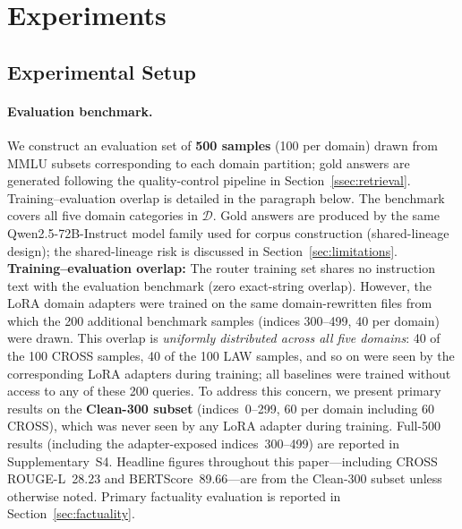 \documentclass[a4paper,fleql,doubleblind]{cas-sc}
\begin{document}
\section{Experiments}
\label{sec:experiments}

\subsection{Experimental Setup}
\label{ssec:setup}
\paragraph{Evaluation benchmark.}
We construct an evaluation set of \textbf{500 samples} (100 per domain) drawn
from MMLU subsets corresponding to each domain partition; gold answers are
generated following the quality-control pipeline in Section~\ref{ssec:retrieval}.
Training--evaluation overlap is detailed in the paragraph below.
The benchmark covers all five domain categories in $\mathcal{D}$.
Gold answers are produced by the same Qwen2.5-72B-Instruct model family
used for corpus construction (shared-lineage design); the shared-lineage
risk is discussed in Section~\ref{sec:limitations}.
\textbf{Training--evaluation overlap:} The router training set shares no
instruction text with the evaluation benchmark (zero exact-string overlap).
However, the LoRA domain adapters were trained on the same domain-rewritten
files from which the 200 additional benchmark samples (indices 300--499,
40 per domain) were drawn.
This overlap is \emph{uniformly distributed across all five domains}: 40 of
the 100 CROSS samples, 40 of the 100 LAW samples, and so on were seen by the
corresponding LoRA adapters during training; all baselines were trained without
access to any of these 200 queries.
To address this concern, we present primary results on the \textbf{Clean-300 subset} (indices~0--299, 60 per domain including 60 CROSS), which was never seen by any LoRA adapter during training. Full-500 results (including the adapter-exposed indices~300--499) are reported in Supplementary~S4. Headline figures throughout this paper---including CROSS ROUGE-L~28.23 and BERTScore~89.66---are from the Clean-300 subset unless otherwise noted.
Primary factuality evaluation is reported in Section~\ref{sec:factuality}.
\end{document}

